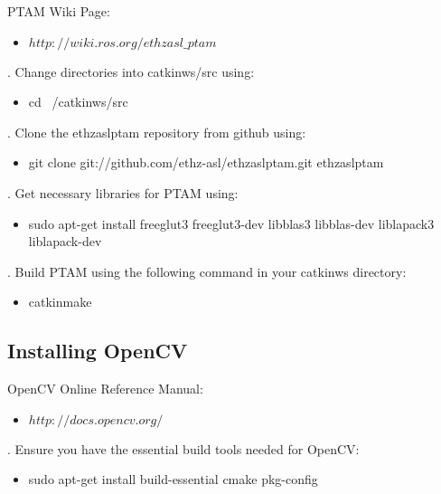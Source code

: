 \noindent PTAM Wiki Page:
\begin{itemize}
	\item[]\href{http://wiki.ros.org/ethzasl_ptam}{$http://wiki.ros.org/ethzasl\_ptam$}
\end{itemize}

. Change directories into catkin\textunderscore ws/src using:
\begin{itemize}
	\item[]cd ~/catkin\textunderscore ws/src
\end{itemize}

. Clone the ethzasl\textunderscore ptam repository from github using:
\begin{itemize}
	\item[]git clone git://github.com/ethz-asl/ethzasl\textunderscore ptam.git ethzasl\textunderscore ptam
\end{itemize}

. Get necessary libraries for PTAM using:
\begin{itemize}
	\item[]sudo apt-get install freeglut3 freeglut3-dev libblas3 libblas-dev liblapack3 liblapack-dev
\end{itemize}

. Build PTAM using the following command in your catkin\textunderscore ws directory:
\begin{itemize}
	\item[]catkin\textunderscore make
\end{itemize}


\subsection{Installing OpenCV}

\noindent OpenCV Online Reference Manual:
\begin{itemize}
	\item[]\href{http://docs.opencv.org/}{$http://docs.opencv.org/$}
\end{itemize}

. Ensure you have the essential build tools needed for OpenCV:
\begin{itemize}
	\item[]sudo apt-get install build-essential cmake pkg-config
\end{itemize}

